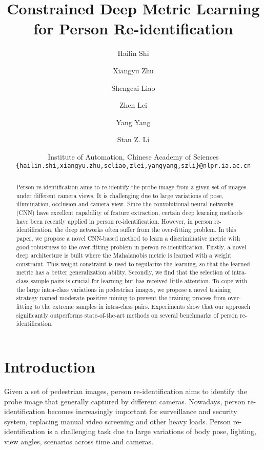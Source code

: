 \documentclass[10pt,twocolumn,letterpaper]{article}
\begin{document}

\title{Constrained Deep Metric Learning for Person Re-identification}

\author{Hailin Shi \and Xiangyu Zhu \and Shengcai Liao \and Zhen Lei \and Yang Yang \and Stan Z. Li \and
Institute of Automation, Chinese Academy of Sciences \\
{\tt \small \{hailin.shi,xiangyu.zhu,scliao,zlei,yangyang,szli\}@nlpr.ia.ac.cn}}


\maketitle

\begin{abstract}
   Person re-identification aims to re-identify the probe image from a given set of images under different camera views. It is challenging due to large variations of pose, illumination, occlusion and camera view.
   Since the convolutional neural networks (CNN) have excellent capability of feature extraction, certain deep learning methods have been recently applied in person re-identification.
   However, in person re-identification, the deep networks often suffer from the over-fitting problem.
   In this paper, we propose a novel CNN-based method to learn a discriminative metric with good robustness to the over-fitting problem in person re-identification.
   Firstly, a novel deep architecture is built where the Mahalanobis metric is learned with a weight constraint.
   This weight constraint is used to regularize the learning, so that the learned metric has a better generalization ability.
   Secondly, we find that the selection of intra-class sample pairs is crucial for learning but has received little attention.
   To cope with the large intra-class variations in pedestrian images, we propose a novel training strategy named moderate positive mining to prevent the training process from over-fitting to the extreme samples in intra-class pairs.
   Experiments show that our approach significantly outperforms state-of-the-art methods on several benchmarks of person re-identification.
\end{abstract}

\section{Introduction}
\label{section_Introduction}

Given a set of pedestrian images, person re-identification aims to identify the probe image that generally captured by different cameras. Nowadays, person re-identification becomes increasingly important for surveillance and security system, \eg replacing manual video screening and other heavy loads.
Person re-identification is a challenging task due to large variations of body pose, lighting, view angles, scenarios across time and cameras.
\end{document}
